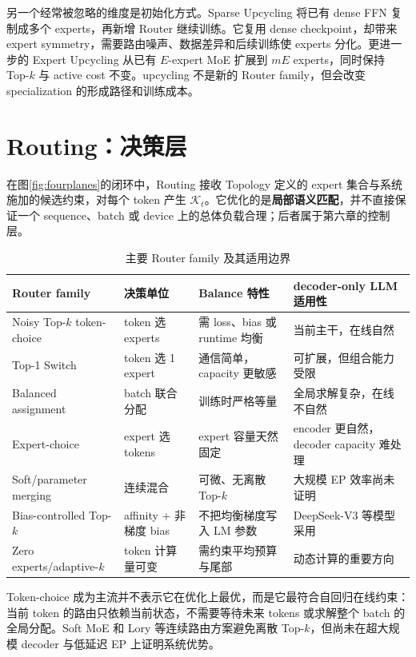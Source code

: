 \documentclass[10pt,a4paper,fontset=none]{ctexart}
\newcommand{\term}[1]{\textbf{#1}}
\begin{document}
另一个经常被忽略的维度是初始化方式。Sparse Upcycling 将已有 dense FFN 复制成多个 experts，再新增 Router 继续训练\cite{komatsuzaki2022upcycling}。它复用 dense checkpoint，却带来 expert symmetry，需要路由噪声、数据差异和后续训练使 experts 分化。更进一步的 Expert Upcycling 从已有 $E$-expert MoE 扩展到 $mE$ experts，同时保持 Top-$k$ 与 active cost 不变\cite{expertUpcycling2026}。upcycling 不是新的 Router family，但会改变 specialization 的形成路径和训练成本。

\section{Routing：决策层}

在图\ref{fig:fourplanes}的闭环中，Routing 接收 Topology 定义的 expert 集合与系统施加的候选约束，对每个 token 产生 $\mathcal{K}_t$。它优化的是\term{局部语义匹配}，并不直接保证一个 sequence、batch 或 device 上的总体负载合理；后者属于第六章的控制层。

\begin{table}[htbp]
\centering
\caption{主要 Router family 及其适用边界}
\label{tab:router}
\small
\begin{tabularx}{\textwidth}{p{}p{}Y Y}
\toprule
Router family & 决策单位 & Balance 特性 & decoder-only LLM 适用性 \\
\midrule
Noisy Top-$k$ token-choice & token 选 experts & 需 loss、bias 或 runtime 均衡 & 当前主干，在线自然 \\
Top-1 Switch & token 选 1 expert & 通信简单，capacity 更敏感 & 可扩展，但组合能力受限 \\
Balanced assignment & batch 联合分配 & 训练时严格等量 & 全局求解复杂，在线不自然 \\
Expert-choice & expert 选 tokens & expert 容量天然固定 & encoder 更自然，decoder capacity 难处理 \\
Soft/parameter merging & 连续混合 & 可微、无离散 Top-$k$ & 大规模 EP 效率尚未证明 \\
Bias-controlled Top-$k$ & affinity + 非梯度 bias & 不把均衡梯度写入 LM 参数 & DeepSeek-V3 等模型采用 \\
Zero experts/adaptive-$k$ & token 计算量可变 & 需约束平均预算与尾部 & 动态计算的重要方向 \\
\bottomrule
\end{tabularx}
\end{table}

Token-choice 成为主流并不表示它在优化上最优，而是它最符合自回归在线约束：当前 token 的路由只依赖当前状态，不需要等待未来 tokens 或求解整个 batch 的全局分配。Soft MoE 和 Lory 等连续路由方案避免离散 Top-$k$，但尚未在超大规模 decoder 与低延迟 EP 上证明系统优势\cite{puigcerver2023softmoe,zhong2024lory}。
\end{document}
